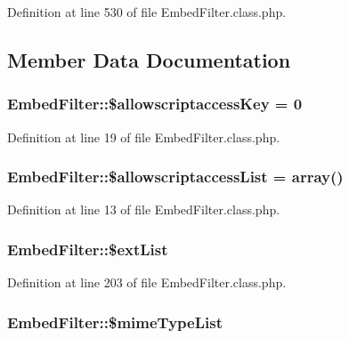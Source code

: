 Definition at line 530 of file Embed\-Filter.\-class.\-php.



\subsection{Member Data Documentation}
\hypertarget{classEmbedFilter_a643732fe7a32d323e2123bd1ef9f3bdb}{
\subsubsection[{\$allowscriptaccess\-Key}]{\setlength{\rightskip}{0pt plus 5cm}Embed\-Filter\-::\$allowscriptaccess\-Key = 0}}\label{classEmbedFilter_a643732fe7a32d323e2123bd1ef9f3bdb}


Definition at line 19 of file Embed\-Filter.\-class.\-php.

\hypertarget{classEmbedFilter_a09ba67f124ae7f35412a1bb11f2419c7}{
\subsubsection[{\$allowscriptaccess\-List}]{\setlength{\rightskip}{0pt plus 5cm}Embed\-Filter\-::\$allowscriptaccess\-List = array()}}\label{classEmbedFilter_a09ba67f124ae7f35412a1bb11f2419c7}


Definition at line 13 of file Embed\-Filter.\-class.\-php.

\hypertarget{classEmbedFilter_ae4ef00ed26254ca247a83d91b021a928}{
\subsubsection[{\$ext\-List}]{\setlength{\rightskip}{0pt plus 5cm}Embed\-Filter\-::\$ext\-List}}\label{classEmbedFilter_ae4ef00ed26254ca247a83d91b021a928}


Definition at line 203 of file Embed\-Filter.\-class.\-php.

\hypertarget{classEmbedFilter_a6bbd35ce27aaa1eda9600f8ee78b9b34}{
\subsubsection[{\$mime\-Type\-List}]{\setlength{\rightskip}{0pt plus 5cm}Embed\-Filter\-::\$mime\-Type\-List}}\label{classEmbedFilter_a6bbd35ce27aaa1eda9600f8ee78b9b34}


